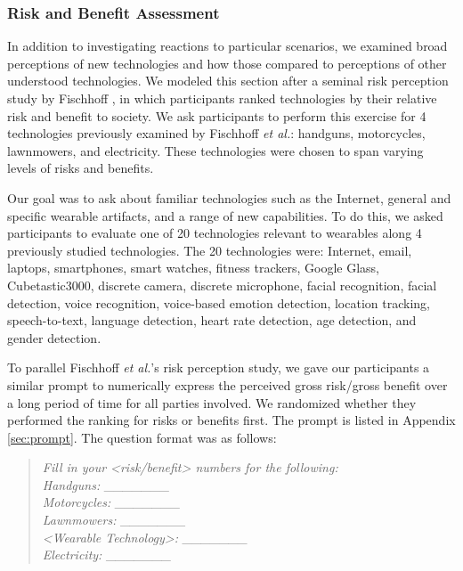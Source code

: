 \subsubsection{Risk and Benefit Assessment}
In addition to investigating reactions to particular scenarios, we examined broad perceptions of new technologies and how those compared to perceptions of other understood technologies. We modeled this section after a seminal risk perception study by Fischhoff \etal\cite{Fischhoff}, in which participants ranked technologies by their relative risk and benefit to society. We ask participants to perform this exercise for 4 technologies previously examined by Fischhoff {\it et al.}: handguns, motorcycles, lawnmowers, and electricity.  These technologies were chosen to span varying levels of risks and benefits.

Our goal was to ask about familiar technologies such as the Internet, general and specific wearable artifacts, and a range of new capabilities. To do this, we asked participants to evaluate one of 20 technologies relevant to wearables along 4 previously studied technologies. The 20 technologies were: Internet, email, laptops, smartphones, smart watches, fitness trackers, Google Glass, Cubetastic3000, discrete camera, discrete microphone, facial recognition, facial detection, voice recognition, voice-based emotion detection, location tracking, speech-to-text, language detection, heart rate detection, age detection, and gender detection.

To parallel Fischhoff {\it et al.}'s risk perception study, we gave our participants a similar prompt to numerically express the perceived gross risk/gross benefit over a long period of time for all parties involved. We randomized whether they performed the ranking for risks or benefits first. The prompt is listed in Appendix \ref{sec:prompt}. The question format was as follows:

\begin{quotation}
{\it \noindent Fill in your <risk/benefit> numbers for the following:\\

\noindent Handguns: \_\_\_\_\_\_\_ \\
Motorcycles: \_\_\_\_\_\_\_\\
Lawnmowers: \_\_\_\_\_\_\_\\
<Wearable Technology>: \_\_\_\_\_\_\_\\
Electricity: \_\_\_\_\_\_\_\\ }
\end{quotation} 

